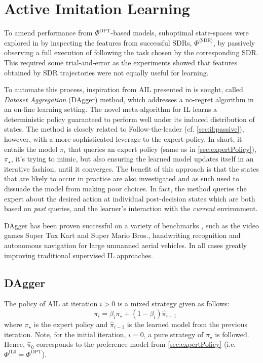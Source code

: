 \documentclass[twocolumn]{svjour3}
\begin{document}
\section{Active Imitation Learning}\label{sec:il:active}

To amend performance from $\Phi^{\text{OPT}}$-based models, suboptimal 
state-spaces were explored in \cite{InRu15a} by inspecting the features from 
successful SDRs, $\Phi^{\langle\text{SDR}\rangle}$, by passively observing a 
full execution of following the task chosen by the corresponding SDR. 
This required some trial-and-error as the experiments showed that features 
obtained by SDR trajectories were not equally useful for learning.

To automate this process, inspiration from AIL presented in \cite{RossGB11} is 
sought, called \emph{Dataset Aggregation} (DAgger) method, which addresses a 
no-regret algorithm in an on-line learning setting. 
The novel meta-algorithm for IL learns a deterministic policy guaranteed to 
perform well under its induced distribution of states. 
The method is closely related to Follow-the-leader (cf. 
\cref{sec:il:passive}), however, with a more sophisticated leverage to the 
expert policy. 
In short, it entails the model $\pi_i$ that queries an expert policy (same as 
in \cref{sec:expertPolicy}), $\pi_\star$, it's trying to mimic, 
but also ensuring the learned model updates itself in an iterative fashion, 
until it converges. 
The benefit of this approach is that the states that are likely to occur in 
practice are also investigated and as such used to dissuade the model from 
making poor choices. In fact, the method queries the expert about the desired 
action at individual post-decision states which are both based on \emph{past} 
queries, and the learner's interaction with the \emph{current} environment.

DAgger has been proven successful on a variety of benchmarks 
\cite{RossGB11,Ross13}, such as the video games Super Tux Kart and Super 
Mario Bros., handwriting recognition and autonomous navigation for large 
unmanned aerial vehicles. In all cases greatly improving traditional supervised 
IL approaches.

\subsection{DAgger}
The policy of AIL at iteration $i>0$ is a mixed strategy given as follows:
\begin{equation}\quad\label{eq:il}
\pi_i = \beta_i\pi_\star + (1-\beta_i)\hat{\pi}_{i-1}
\end{equation}
where $\pi_\star$ is the expert policy and $\hat{\pi}_{i-1}$ is the learned 
model from the previous iteration. 
Note, for the initial iteration, $i=0$, a pure strategy of $\pi_\star$ is 
followed. Hence, $\hat{\pi}_0$ corresponds to the preference model from 
\cref{sec:expertPolicy} (i.e. $\Phi^{\text{IL}0}=\Phi^{\text{OPT}}$). 
\end{document}
